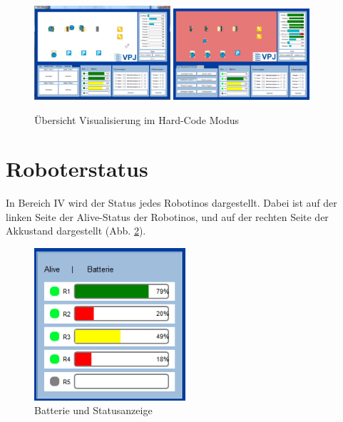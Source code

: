 \begin{figure}[htb]
    \centering
    \includegraphics[width=0.45\textwidth]{Abbildungen/Gesamtprogramm.png}
    \includegraphics[width=0.45\textwidth]{Abbildungen/GesamtprogrammROT.png}
    \caption{Übersicht Visualisierung im Hard-Code Modus}		
    \label{fig:GesamtprogrammROT}
\end{figure}

\section{Roboterstatus}

In Bereich IV wird der Status jedes Robotinos dargestellt. Dabei ist auf der linken Seite der Alive-Status der Robotinos, und auf der rechten Seite der Akkustand dargestellt (Abb. \ref{fig:Batterie}). 

\begin{figure}[htb]
    \centering
    \includegraphics[width=0.5\textwidth]{Abbildungen/Batterie.png}
    \caption{Batterie und Statusanzeige}		
    \label{fig:Batterie}
\end{figure}

